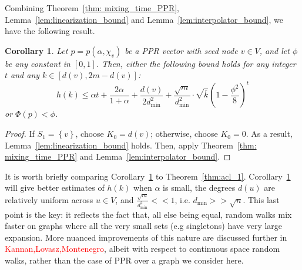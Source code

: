 \documentclass{article}
\newcommand{\set}[1]{\left\{#1\right\}}
\newcommand{\1}{\mathbf{1}}
\theoremstyle{alden}
\theoremstyle{aldenthm}
\newtheorem{corollary}{Corollary}
\theoremstyle{remark}
\begin{document}
Combining Theorem~\ref{thm: mixing_time_PPR}, Lemma~\ref{lem:linearization_bound} and Lemma~\ref{lem:interpolator_bound}, we have the following result.
\begin{corollary}
	\label{cor:mixing_time_PPR}
	Let $p = p(\alpha,\chi_v)$ be a PPR vector with seed node $v \in V$, and let $\phi$ be any constant in $[0,1]$. Then, either the following bound holds for any integer $t$ and any $k \in [d(v),2m - d(v)]$:
	\begin{equation*}
	h(k) \leq \alpha t + \frac{2\alpha}{1 + \alpha} + \frac{d(v)}{2d_{\min}^2} + \frac{\sqrt{m}}{d_{\min}^2} \cdot \sqrt{\overline{k}} \left(1 - \frac{\phi^2}{8}\right)^{t}
	\end{equation*}
	or $\Phi(p) < \phi$.
\end{corollary}
\begin{proof}
	If $S_1 = \set{v}$, choose $K_0 = d(v)$; otherwise, choose $K_0 = 0$. As a result, Lemma~\ref{lem:linearization_bound} holds. Then, apply Theorem~\ref{thm: mixing_time_PPR} and Lemma~\ref{lem:interpolator_bound}.
\end{proof}
It is worth briefly comparing Corollary~\ref{cor:mixing_time_PPR} to Theorem~\ref{thm:acl_1}. Corollary~\ref{cor:mixing_time_PPR} will give better estimates of $h(k)$ when $\alpha$ is small, the degrees $d(u)$ are relatively uniform across $u \in V$, and $\frac{\sqrt{m}}{d_{\min}^2} << 1$, i.e. $d_{\min} >> \sqrt{n}$. This last point is the key: it reflects the fact that, all else being equal, random walks mix faster on graphs where all the very small sets (e.g singletons) have very large expansion. More nuanced improvements of this nature are discussed further in \textcolor{red}{Kannan,Lovasz,Montenegro}, albeit with respect to continuous space random walks, rather than the case of PPR over a graph we consider here.
\end{document}
